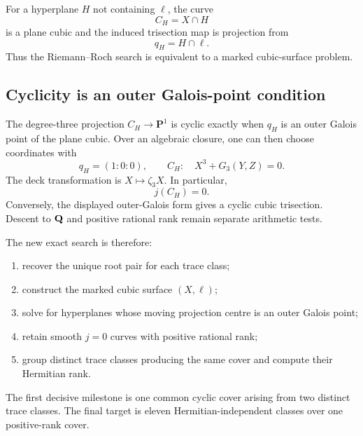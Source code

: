 For a hyperplane $H$ not containing $\ell$, the curve
\[
C_H=X\cap H
\]
is a plane cubic and the induced trisection map is projection from
\[
q_H=H\cap\ell.
\]
Thus the Riemann--Roch search is equivalent to a marked cubic-surface problem.

\subsection{Cyclicity is an outer Galois-point condition}

The degree-three projection $C_H\to\mathbf P^1$ is cyclic exactly when $q_H$
is an outer Galois point of the plane cubic.  Over an algebraic closure, one
can then choose coordinates with
\[
q_H=(1:0:0),
\qquad
C_H:\quad X^3+G_3(Y,Z)=0.
\]
The deck transformation is $X\mapsto\zeta_3X$.  In particular,
\[
\boxed{j(C_H)=0.}
\]
Conversely, the displayed outer-Galois form gives a cyclic cubic trisection.
Descent to $\mathbf Q$ and positive rational rank remain separate arithmetic tests.

The new exact search is therefore:
\begin{enumerate}[leftmargin=*]
\item recover the unique root pair for each trace class;
\item construct the marked cubic surface $(X,\ell)$;
\item solve for hyperplanes whose moving projection centre is an outer Galois point;
\item retain smooth $j=0$ curves with positive rational rank;
\item group distinct trace classes producing the same cover and compute their Hermitian rank.
\end{enumerate}

The first decisive milestone is one common cyclic cover arising from two
distinct trace classes.  The final target is eleven Hermitian-independent
classes over one positive-rank cover.
